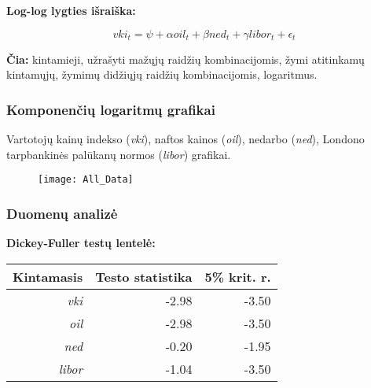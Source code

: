 \documentclass[utf8x,hyperref={unicode}]{beamer}
\begin{document}
\begin{frame}
\frametitle{}
\textbf{Log-log lygties išraiška:}


\begin{equation}
\textit{vki}_t = \psi + \alpha \textit{oil}_t + \beta \textit{ned}_t + \gamma \textit{libor}_t+\epsilon_t
\end{equation}

\textbf{Čia:} kintamieji, užrašyti mažųjų raidžių kombinacijomis, žymi atitinkamų kintamųjų, žymimų didžiųjų raidžių kombinacijomis, logaritmus.

\end{frame}
\begin{frame}
\frametitle{Komponenčių logaritmų grafikai}

Vartotojų kainų indekso (\textit{vki}), naftos kainos (\textit{oil}), nedarbo (\textit{ned}), Londono tarpbankinės palūkanų normos (\textit{libor}) grafikai.

\begin{figure}[hc]
\centering
\texttt{[image: All\_Data]}
\end{figure}
\end{frame}
\begin{frame}
\frametitle{Duomenų analizė}

\textbf{Dickey-Fuller testų lentelė:}

\begin{table}[!h]
\begin{center}
\begin{tabular}{rrr}
  \hline
Kintamasis & Testo statistika & 5\% krit. r. \\
  \hline
\textit{vki} & -2.98 & -3.50 \\
\textit{oil} & -2.98 & -3.50 \\
\textit{ned} & -0.20 & -1.95 \\
\textit{libor} & -1.04 & -3.50 \\
   \hline
\end{tabular}
\end{center}
\end{table}

\end{frame}
\end{document}
